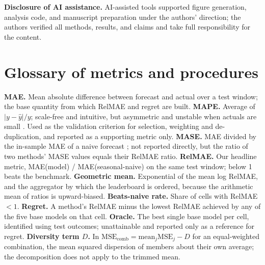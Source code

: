 \documentclass[11pt]{article}
\begin{document}
\textbf{Disclosure of AI assistance.} AI-assisted tools supported figure generation, analysis code, and manuscript preparation under the authors' direction; the authors verified all methods, results, and claims and take full responsibility for the content.



\appendix
\section{Glossary of metrics and procedures}

\textbf{MAE.} Mean absolute difference between forecast and actual over a test window; the base quantity from which RelMAE and regret are built. \textbf{MAPE.} Average of $|y - \hat y| / y$; scale-free and intuitive, but asymmetric and unstable when actuals are small \citep{kolassa2016}. Used as the validation criterion for selection, weighting and de-duplication, and reported as a supporting metric only. \textbf{MASE.} MAE divided by the in-sample MAE of a naive forecast \citep{hyndman2006}; not reported directly, but the ratio of two methods' MASE values equals their RelMAE ratio. \textbf{RelMAE.} Our headline metric, MAE(model) / MAE(seasonal-naive) on the same test window; below 1 beats the benchmark. \textbf{Geometric mean.} Exponential of the mean log RelMAE, and the aggregator by which the leaderboard is ordered, because the arithmetic mean of ratios is upward-biased. \textbf{Beats-naive rate.} Share of cells with RelMAE $< 1$. \textbf{Regret.} A method's RelMAE minus the lowest RelMAE achieved by any of the five base models on that cell. \textbf{Oracle.} The best single base model per cell, identified using test outcomes; unattainable and reported only as a reference for regret. \textbf{Diversity term $D$.} In $\mathrm{MSE}_{\text{comb}} = \mathrm{mean}_j \mathrm{MSE}_j - D$ for an equal-weighted combination, the mean squared dispersion of members about their own average; the decomposition does not apply to the trimmed mean.
\end{document}
